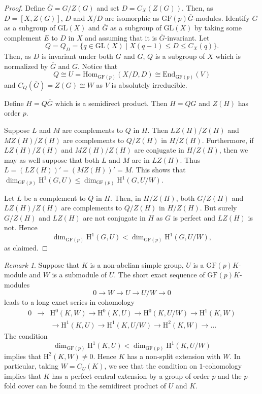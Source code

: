 \documentclass[12pt]{amsart}
\theoremstyle{remark}
\newtheorem{remark}[theorem]{Remark}
\theoremstyle{notation}
\theoremstyle{definition}
\newcommand{\Hom}{\mathrm{Hom}}
\newcommand{\GF}{\mathrm{GF}}
\newcommand{\GL}{\mathrm{GL}}
\newcommand{\0}{\emptyset}
\begin{document}
\begin{proof} Define $\overline G=G/Z(G)$ and set $D=C_X(Z(G))$. Then, as $D=[X,Z(G)]$, $D$ and $X/D$ are isomorphic as $\GF(p)\overline G$-modules.
 Identify  $G$ as a subgroup of $\GL(X)$ and $\overline G$ as a subgroup of $\GL(X)$ by taking some complement $E$ to $D$ in $X$ and assuming that it is $\overline G$-invariant. Let
 $$Q =Q_D=\{q \in \GL(X)\mid X(q-1)\le D \le C_X(q)\}.$$
 Then, as $D$ is invariant under both $\overline G$ and $G$,  $Q$ is a subgroup of  $X$ which is normalized by $\overline G$ and $G$. Notice that $$Q\cong U=\Hom_{\GF(p)}(X/D,D) \cong \mathrm{End}_{\GF(p) }(V)  $$ and $C_Q(\overline G)=Z(G)\cong   W$ as $V$ is absolutely irreducible.

  Define  $H=Q\overline G$ which is a semidirect product. Then $H= QG$ and $Z(H)  $ has order $p$.

Suppose   $L$ and $M$  are complements to $Q$ in $H$. Then $LZ(H)/Z(H)$ and $MZ(H)/Z(H)$ are complements to $Q/Z(H)$ in $H/Z(H)$. Furthermore, if $LZ(H)/Z(H)$ and $MZ(H)/Z(H)$
are conjugate in $H/Z(H)$, then we may as well suppose that both $L$ and $M$ are in $LZ(H)$. Thus  $L= (LZ(H))'=(MZ(H))'= M$. This shows  that $ \dim_{\GF(p)} \mathrm H^1(G,U) \le  \dim_{\GF(p)} \mathrm H^1(G,U/W)$.

Let $L$ be a complement to $Q$ in $H$. Then, in $H/Z(H)$, both $G/Z(H)$ and $LZ(H)/Z(H)$ are complements to $Q/Z(H)$ in $H/Z(H)$. But surely  $G/Z(H) $ and $LZ(H)$ are not conjugate in $H$ as $G$ is perfect and $LZ(H)$ is not. Hence $$ \dim_{\GF(p)} \mathrm H^1(G,U) <  \dim_{\GF(p)} \mathrm H^1(G,U/W),$$
as claimed.
\end{proof}

\begin{remark}
Suppose that $K$ is a non-abelian simple group, $U$ is a $\GF(p)K$-module and $W$ is a submodule of $U$. The short exact sequence of $\GF(p)K$-modules $$0\rightarrow   W\rightarrow U\rightarrow U/W \rightarrow 0$$ leads to a long exact series in cohomology \begin{eqnarray*}0 &\rightarrow & \mathrm H^0(K,W)\rightarrow \mathrm H^0(K,U)\rightarrow \mathrm H^0(K,U/W)\rightarrow \mathrm H^1(K,W)\\&& \rightarrow \mathrm H^1(K,U)\rightarrow \mathrm H^1(K,U/W)\rightarrow \mathrm H^2(K, W)\rightarrow\dots\end{eqnarray*}
 The condition $$\dim_{\GF(p)} \mathrm H^1(K,U) <  \dim_{\GF(p)} \mathrm H^1(K,U/W)$$  implies that $\mathrm H^2(K, W)\ne 0$. Hence $K$ has a non-split extension with $W$.    In particular, taking $W= C_U(K)$, we see that the condition on $1$-cohomology implies that $K$ has a perfect central extension by a group of order $p$ and the $p$-fold cover can be  found in the semidirect product of $U$ and $K$.
\end{remark}
\end{document}
